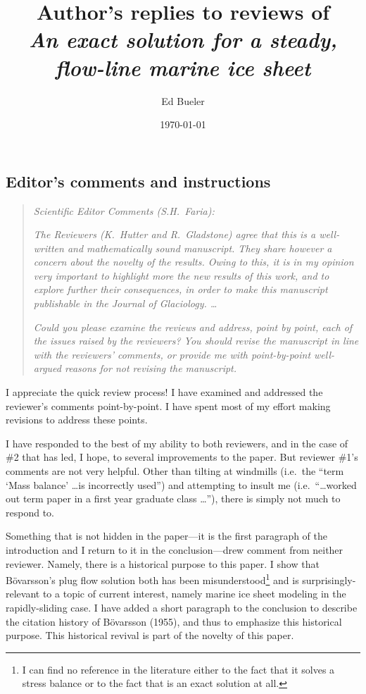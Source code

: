 \documentclass[11pt,reqno]{amsart}
\title[Author's replies to reviews of \emph{An exact solution \dots}]{Author's replies to reviews of \\ \emph{An exact solution for a steady, flow-line marine ice sheet}}
\author{Ed Bueler}
\date{\today}
\renewcommand{\dh}{\fontencoding{T1}\selectfont{\symbol{240}}}
\newcommand{\bod}{B\"o\dh varsson\xspace}
\newcommand{\citebod}{B\"o\dh varsson (1955)\nocite{Bodvardsson}\xspace}
\begin{document}
\maketitle

\thispagestyle{empty}



\subsection*{Editor's comments and instructions}  \begin{quote}
\emph{Scientific Editor Comments (S.H.~Faria):}

\emph{The Reviewers (K.~Hutter and R.~Gladstone) agree that this is a well-written and mathematically sound manuscript. They share however a concern about the novelty of the results. Owing to this, it is in my opinion very important to highlight more the new results of this work, and to explore further their consequences, in order to make this manuscript publishable in the Journal of Glaciology.  \dots}

\emph{Could you please examine the reviews and address, point by point, each of the issues raised by the reviewers? You should revise the manuscript in line with the reviewers' comments, or provide me with point-by-point well-argued reasons for not revising the manuscript.}
\end{quote}

\medskip
\noindent I appreciate the quick review process!  I have examined and addressed the reviewer's comments point-by-point.  I have spent most of my effort making revisions to address these points.

\medskip
\noindent I have responded to the best of my ability to both reviewers, and in the case of \#2 that has led, I hope, to several improvements to the paper.  But reviewer \#1's comments are not very helpful.  Other than tilting at windmills (i.e.~the ``term `Mass balance' \dots is incorrectly used'') and attempting to insult me (i.e.~``\dots worked out term paper in a first year graduate class \dots''), there is simply not much to respond to.

\medskip
\noindent Something that is not hidden in the paper---it is the first paragraph of the introduction and I return to it in the conclusion---drew comment from neither reviewer.  Namely, there is a historical purpose to this paper.  I show that \bod's plug flow solution both has been misunderstood\footnote{I can find no reference in the literature either to the fact that it solves a stress balance or to the fact that is an exact solution at all.} and is surprisingly-relevant to a topic of current interest, namely marine ice sheet modeling in the rapidly-sliding case.  I have added a short paragraph to the conclusion to describe the citation history of \citebod, and thus to emphasize this historical purpose.  This historical revival is part of the novelty of this paper.
\end{document}
